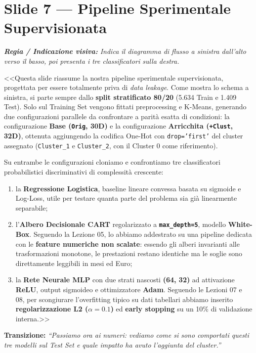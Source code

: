 \documentclass[10pt, a4paper]{article}
\newcommand{\cue}[1]{%
  \par\vspace{2pt}\noindent\colorbox{CueBg}{\parbox{\dimexpr\linewidth-2\fboxsep}{\footnotesize\textit{\color{PrimaryNavy}\textbf{Regia / Indicazione visiva:} #1}}}\par\vspace{3pt}%
}
\newcommand{\transition}[1]{%
  \par\vspace{2pt}\noindent\colorbox{LightBg}{\parbox{\dimexpr\linewidth-2\fboxsep}{\small\textbf{\color{SecondaryBlue}Transizione:} \textit{``#1''}}}\par\vspace{4pt}%
}
\begin{document}
\section*{Slide 7 --- Pipeline Sperimentale Supervisionata}
\cue{Indica il diagramma di flusso a sinistra dall'alto verso il basso, poi presenta i tre classificatori sulla destra.}
\noindent <<Questa slide riassume la nostra pipeline sperimentale supervisionata, progettata per essere totalmente priva di \textit{data leakage}. Come mostra lo schema a sinistra, si parte sempre dallo \textbf{split stratificato 80/20} (5.634 Train e 1.409 Test). Solo sul Training Set vengono fittati preprocessing e K-Means, generando due configurazioni parallele da confrontare a parità esatta di condizioni: la configurazione \textbf{Base (\texttt{Orig}, 30D)} e la configurazione \textbf{Arricchita (\texttt{+Clust}, 32D)}, ottenuta aggiungendo la codifica One-Hot con \texttt{drop='first'} del cluster assegnato (\texttt{Cluster\_1} e \texttt{Cluster\_2}, con il Cluster 0 come riferimento).

Su entrambe le configurazioni cloniamo e confrontiamo tre classificatori probabilistici discriminativi di complessità crescente:
\begin{enumerate}
    \item la \textbf{Regressione Logistica}, baseline lineare convessa basata su sigmoide e Log-Loss, utile per testare quanta parte del problema sia già linearmente separabile;
    \item l'\textbf{Albero Decisionale CART} regolarizzato a \textbf{\texttt{max\_depth=5}}, modello \textbf{White-Box}. Seguendo la Lezione 05, lo abbiamo addestrato su una pipeline dedicata con le \textbf{feature numeriche non scalate}: essendo gli alberi invarianti alle trasformazioni monotone, le prestazioni restano identiche ma le soglie sono direttamente leggibili in mesi ed Euro;
    \item la \textbf{Rete Neurale MLP} con due strati nascosti \textbf{(64, 32)} ad attivazione \textbf{ReLU}, output sigmoideo e ottimizzatore \textbf{Adam}. Seguendo le Lezioni 07 e 08, per scongiurare l'overfitting tipico su dati tabellari abbiamo inserito \textbf{regolarizzazione L2 ($\alpha=0.1$)} ed \textbf{early stopping} su un 10\% di validazione interna.>>
\end{enumerate}
\transition{Passiamo ora ai numeri: vediamo come si sono comportati questi tre modelli sul Test Set e quale impatto ha avuto l'aggiunta del cluster.}
\end{document}
